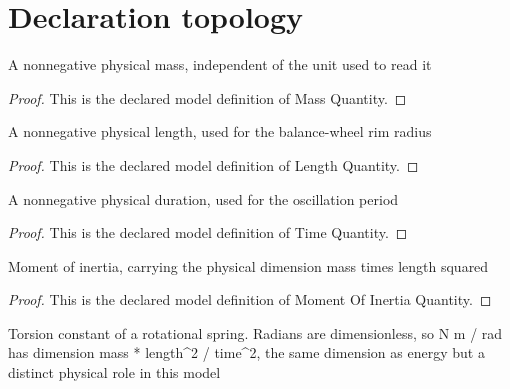 \section{Declaration topology}
\begin{definition}
  \label{def:physics:phyx-mini-0228:phyxminiproblems-problemphyxmini0228-massquantity}
  A nonnegative physical mass, independent of the unit used to read it
\end{definition}
\begin{proof}
  This is the declared model definition of Mass Quantity.
\end{proof}
\begin{definition}
  \label{def:physics:phyx-mini-0228:phyxminiproblems-problemphyxmini0228-lengthquantity}
  A nonnegative physical length, used for the balance-wheel rim radius
\end{definition}
\begin{proof}
  This is the declared model definition of Length Quantity.
\end{proof}
\begin{definition}
  \label{def:physics:phyx-mini-0228:phyxminiproblems-problemphyxmini0228-timequantity}
  A nonnegative physical duration, used for the oscillation period
\end{definition}
\begin{proof}
  This is the declared model definition of Time Quantity.
\end{proof}
\begin{definition}
  \label{def:physics:phyx-mini-0228:phyxminiproblems-problemphyxmini0228-momentofinertiaquantity}
  Moment of inertia, carrying the physical dimension mass times length squared
\end{definition}
\begin{proof}
  This is the declared model definition of Moment Of Inertia Quantity.
\end{proof}
\begin{definition}
  \label{def:physics:phyx-mini-0228:phyxminiproblems-problemphyxmini0228-torsionconstantquantity}
  Torsion constant of a rotational spring. Radians are dimensionless, so N m / rad has dimension mass * length\textasciicircum{}2 / time\textasciicircum{}2, the same dimension as energy but a distinct physical role in this model
\end{definition}
